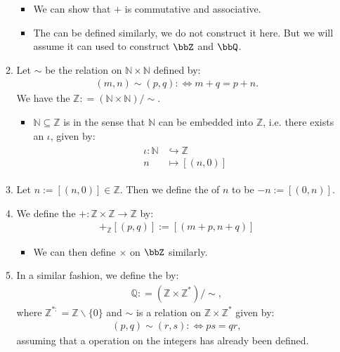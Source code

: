 \documentclass{article}
\begin{document}
\begin{enumerate}
\begin{enumerate}
\begin{itemize}
    \item We can show that $+$ is commutative and associative.
    \item The  can be defined similarly, we do not construct it here. But we will assume it can used to construct $\bbZ$ and $\bbQ$.
\end{itemize}
\item Let $\sim$ be the relation on $\mathbb{N} \times \mathbb{N}$ defined by:
\begin{align*}
(m, n) \sim(p, q): \Leftrightarrow m+q=p+n .
\end{align*}
We have the  $\mathbb{Z:}=(\mathbb{N} \times \mathbb{N}) / \sim .$
\begin{itemize}
    \item $\mathbb{N}\subseteq \mathbb{Z}$ is in the sense that $\mathbb{N}$ can be embedded into $\mathbb{Z}$, i.e. there exists an  $\iota$, given by:
\begin{align*}
\begin{aligned}
\iota: \mathbb{N} & \hookrightarrow \mathbb{Z} \\
n & \mapsto[(n, 0)]
\end{aligned}
\end{align*}
\end{itemize}
\item  Let $n:=[(n, 0)] \in \mathbb{Z}$. Then we define the  of $n$ to be $-n:=[(0, n)]$.
\item We define the  $+: \mathbb{Z} \times \mathbb{Z} \rightarrow \mathbb{Z}$ by:
\begin{align*}
[(m, n)]+_{\mathbb{Z}}[(p, q)]:=[(m+p, n+q)]
\end{align*}
\begin{itemize}
    \item We can then define $\times$ on $\bbZ$ similarly.
\end{itemize}
\item In a similar fashion, we define the  by:
\begin{align*}
\mathbb{Q:}=\left(\mathbb{Z} \times \mathbb{Z}^{*}\right) / \sim,
\end{align*}
where $\mathbb{Z}^{*:}=\mathbb{Z} \backslash\{0\}$ and $\sim$ is a relation on $\mathbb{Z} \times \mathbb{Z}^{*}$ given by:
\begin{align*}
(p, q) \sim(r, s): \Leftrightarrow p s=q r,
\end{align*}
assuming that a  operation on the integers has already been defined.


\end{enumerate}
\end{enumerate}
\end{document}
